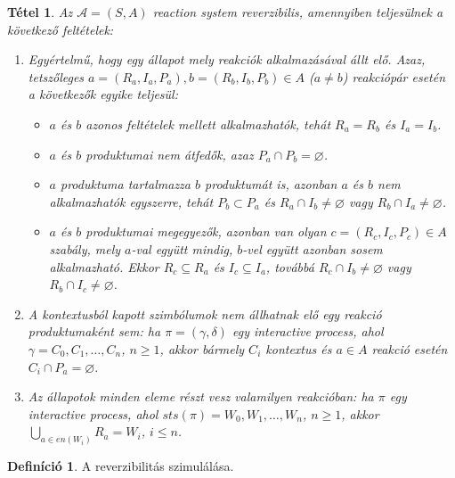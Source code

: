 \documentclass[12pt]{article}
\theoremstyle{definition}
\newtheorem*{definition*}{Definíció}
\theoremstyle{plain}
\newtheorem*{theorem*}{Tétel}
\let\emptyset\varnothing
\begin{document}
    \begin{theorem*}
        Az $\mathcal{A} = (S, A)$ \textit{reaction system} reverzibilis, amennyiben teljesülnek a következő feltételek:
        \begin{enumerate}[label={(\arabic*)}]
            \item
            Egyértelmű, hogy egy állapot mely reakciók alkalmazásával állt elő. Azaz, tetszőleges $a = (R_{a}, I_{a}, P_{a}), b = (R_{b}, I_{b}, P_{b}) \in A$ ($a \neq b$) reakciópár esetén a következők egyike teljesül:
            \begin{itemize}
                \item
                $a$ és $b$ azonos feltételek mellett alkalmazhatók, tehát $R_{a} = R_{b}$ és $I_{a} = I_{b}$.

                \item
                $a$ és $b$ produktumai nem átfedők, azaz $P_{a} \cap P_{b} = \emptyset$.

                \item
                $a$ produktuma tartalmazza $b$ produktumát is, azonban $a$ és $b$ nem alkalmazhatók egyszerre, tehát $P_{b} \subset P_{a}$ és $R_{a} \cap I_{b} \neq \emptyset$ vagy $R_{b} \cap I_{a} \neq \emptyset$.

                \item
                $a$ és $b$ produktumai megegyezők, azonban van olyan $c = (R_{c}, I_{c}, P_{c}) \in A$ szabály, mely $a$-val együtt mindig, $b$-vel együtt azonban sosem alkalmazható. Ekkor $R_{c} \subseteq R_{a}$ és $I_{c} \subseteq I_{a}$, továbbá $R_{c} \cap I_{b} \neq \emptyset$ vagy $R_{b} \cap I_{c} \neq \emptyset$.
            \end{itemize} 

            \item
            A kontextusból kapott szimbólumok nem állhatnak elő egy reakció produktumaként sem: ha $\pi = (\gamma, \delta)$ egy \textit{interactive process}, ahol $\gamma = C_{0}, C_{1}, \ldots, C_{n}$, $n \geq 1$, akkor bármely $C_{i}$ kontextus és $a \in A$ reakció esetén $C_{i} \cap P_{a} = \emptyset$.

            \item
            Az állapotok minden eleme részt vesz valamilyen reakcióban: ha $\pi$ egy \textit{interactive process}, ahol $\textit{sts}(\pi) = W_{0}, W_{1}, \ldots, W_{n}$, $n \geq 1$, akkor $\bigcup_{a \in \textit{en}(W_{i})} R_{a} = W_{i}$, $i \leq n$.
        \end{enumerate}
    \end{theorem*}

    \begin{definition*}
        A reverzibilitás szimulálása.
    \end{definition*}
\end{document}
